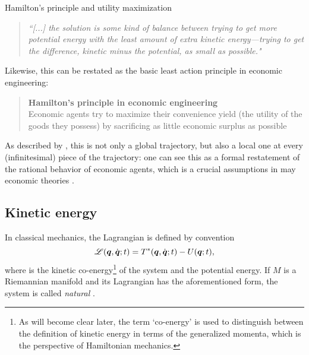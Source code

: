 \begin{econ}{Hamilton's principle and utility maximization}
    \begin{quote}
        \emph{``[...] the solution is some kind of balance between trying to get more potential energy with the least amount of extra kinetic energy—trying to get the difference, kinetic minus the potential, as small as possible."}
    \end{quote}
    Likewise, this can be restated as the basic least action principle in economic engineering:
    \begin{quote}
        \textbf{Hamilton's principle in economic engineering}\\ Economic agents try  to maximize their convenience yield (the utility of the goods they possess) by sacrificing as little  economic surplus as possible
    \end{quote}
    As described by \citet{Feynman2010}, this is not only a global trajectory, but also a local one at every (infinitesimal) piece of the trajectory: one can see this as a formal restatement of the rational behavior of economic agents, which is a crucial assumptions in may economic theories \cite{Mankiw2017}.
\end{econ}

\subsection{Kinetic energy}
In classical mechanics, the Lagrangian is defined by convention
\[\mathscr{L}(\vb*{q},\dot{\vb*{q}}; t) = T^*(\vb*{q},\dot{\vb*{q}}; t) - U(\vb*{q}; t),\] 
where \ecokin is the kinetic co-energy\footnote{As will become clear later, the term `co-energy' is used to distinguish between the definition of kinetic energy in terms of the generalized momenta, which is the perspective of Hamiltonian mechanics.} of the system and \epot the potential energy. If \(M\) is a Riemannian manifold and its Lagrangian has the aforementioned form, the system is called \emph{natural} \cite{Arnold1989}.

